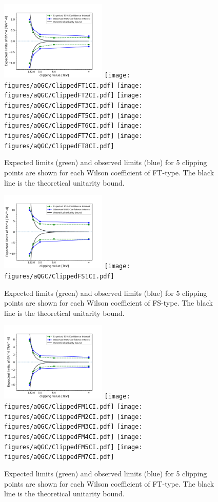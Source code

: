\begin{figure}[ht]
   \centering
   \includegraphics[width=0.45\textwidth]{figures/aQGC/ClippedFT0CI.pdf}
   \texttt{[image: figures/aQGC/ClippedFT1CI.pdf]}
   \texttt{[image: figures/aQGC/ClippedFT2CI.pdf]}
   \texttt{[image: figures/aQGC/ClippedFT3CI.pdf]}
   \texttt{[image: figures/aQGC/ClippedFT5CI.pdf]}
   \texttt{[image: figures/aQGC/ClippedFT6CI.pdf]}
   \texttt{[image: figures/aQGC/ClippedFT7CI.pdf]}
   \texttt{[image: figures/aQGC/ClippedFT8CI.pdf]}
   \caption{Expected limits (green) and observed limits (blue) for 5 clipping points are shown for each Wilson coefficient of FT-type. 
   The black line is the theoretical unitarity bound.}
        \label{fig:aQGClimitsFTs}
\end{figure}
\begin{figure}[ht]
   \centering
   \includegraphics[width=0.45\textwidth]{figures/aQGC/ClippedFS02CI.pdf}
   \texttt{[image: figures/aQGC/ClippedFS1CI.pdf]}
   \caption{Expected limits (green) and observed limits (blue) for 5 clipping points are shown for each Wilson coefficient of FS-type. 
   The black line is the theoretical unitarity bound.}
        \label{fig:aQGClimitsFSs}
\end{figure}
\begin{figure}[ht]
   \centering
   \includegraphics[width=0.45\textwidth]{figures/aQGC/ClippedFM0CI.pdf}
   \texttt{[image: figures/aQGC/ClippedFM1CI.pdf]}
   \texttt{[image: figures/aQGC/ClippedFM2CI.pdf]}
   \texttt{[image: figures/aQGC/ClippedFM3CI.pdf]}
   \texttt{[image: figures/aQGC/ClippedFM4CI.pdf]}
   \texttt{[image: figures/aQGC/ClippedFM5CI.pdf]}
   \texttt{[image: figures/aQGC/ClippedFM7CI.pdf]}
   \caption{Expected limits (green) and observed limits (blue) for 5 clipping points are shown for each Wilson coefficient of FT-type. 
   The black line is the theoretical unitarity bound.}
        \label{fig:aQGClimitsFMs}
\end{figure}
